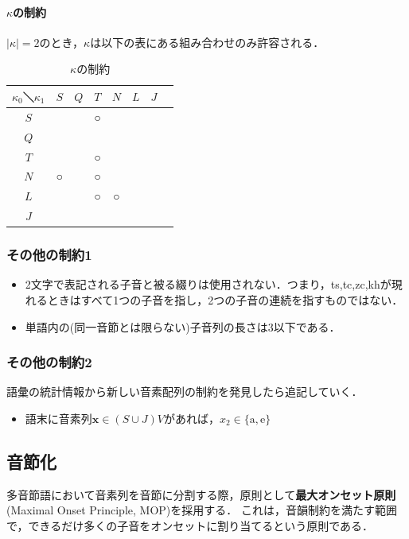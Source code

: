 \documentclass[../../main-detail.tex]{subfiles}
\begin{document}
\paragraph{$\kappa$の制約}
$|\kappa|=2$のとき，$\kappa$は以下の表にある組み合わせのみ許容される．
\begin{table}[H]
  \centering
  \caption{$\kappa$の制約}
  \begin{tabular}{cccccccc}
    \toprule
    $\kappa_0$＼$\kappa_1$ & $S$ & $Q$ & $T$ & $N$ & $L$ & $J$\\
    \midrule
    $S$ & & & ○ & & &\\
    $Q$ & & & & & &\\
    $T$ & & & ○ & & &\\
    $N$ & ○ & & ○& & &\\
    $L$ & & & ○ & ○ & &\\
    $J$ & & & & & & &\\
    \bottomrule
  \end{tabular}
\end{table}
\subsubsection{その他の制約1}
\begin{itemize}
  \item 2文字で表記される子音と被る綴りは使用されない．つまり，ts,tc,zc,khが現れるときはすべて1つの子音を指し，2つの子音の連続を指すものではない．
  \item 単語内の(同一音節とは限らない)子音列の長さは3以下である．
\end{itemize}
\subsubsection{その他の制約2}
語彙の統計情報から新しい音素配列の制約を発見したら追記していく．
\begin{itemize}
  \item 語末に音素列$\bm{x}\in (S\cup J)V$があれば，$x_2\in\{\text{a},\text{e}\}$
\end{itemize}
\subsection{音節化}
多音節語において音素列を音節に分割する際，原則として\textbf{最大オンセット原則}(Maximal Onset Principle, MOP)を採用する．
これは，音韻制約を満たす範囲で，できるだけ多くの子音をオンセットに割り当てるという原則である．
\end{document}
